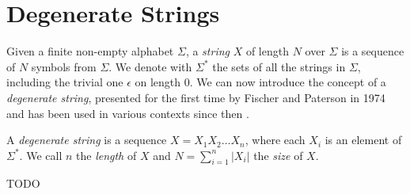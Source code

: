 \section{Degenerate Strings} \label{sec:degenerate_strings}
Given a finite non-empty alphabet $\Sigma$, a \emph{string} $X$ of length $N$ over $\Sigma$ is a sequence of $N$ symbols from $\Sigma$. We denote with $\Sigma^*$ the sets of all the strings in $\Sigma$, including the trivial one $\epsilon$ on length $0$. We can now introduce the concept of a \emph{degenerate string}, presented for the first time by Fischer and Paterson in 1974 \cite{fischer1974string} and has been used in various contexts since then \cite{alzamel2018degenerate}.

\begin{definition}\label{def:degenerate_string}
    A \emph{degenerate string} is a sequence $X = X_1 X_2 \ldots X_n$, where each $X_i$ is an element of $\Sigma^*$. We call $n$ the \emph{length} of $X$ and $N = \sum_{i=1}^{n} |X_i|$ the \emph{size} of $X$.
\end{definition}

\begin{definition}\label{def:balanced_degenerate_string}
    TODO
\end{definition}


